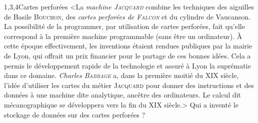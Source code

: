 \begin{quiz}[title={Données et traitements}]
\begin{quizquestion*}[b]{2}{1,3,4}{Cartes perforées}
<La \emph{machine \textsc{Jacquard}} combine les techniques des aiguilles de Basile \textsc{Bouchon}, des \emph{cartes perforées de \textsc{Falcon}} et du cylindre de Vaucanson. La possibilité de la programmer, par utilisation de cartes perforées, fait qu'elle correspond à la première machine programmable (sans être un ordinateur).
À cette époque effectivement, les inventions étaient rendues publiques par la mairie de Lyon, qui offrait un prix financier pour le partage de ces bonnes idées. Cela a permis le développement rapide de la technologie et assuré à Lyon la suprématie dans ce domaine.
\emph{Charles \textsc{Babbage}} a, dans la première moitié du XIX siècle, l'idée d'utiliser les cartes du métier \textsc{Jacquard} pour donner des instructions et des données à une machine dite analytique, ancêtre des ordinateurs.
Le calcul dit mécanographique se développera vers la fin du XIX siècle.>
Qui a inventé le stockage de données sur des cartes perforées ?
\parnotes
\end{quizquestion*}


\end{quiz}
